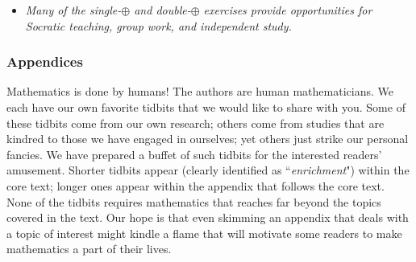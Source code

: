 \begin{itemize}
\medskip\item
{\em Many of the single-$\oplus$ and double-$\oplus$ exercises provide opportunities for Socratic teaching, group work, and independent study.} 

\bigskip

\noindent {}
\end{itemize}

\subsubsection{Appendices}

Mathematics is done by humans!  The authors are human mathematicians.  We each have our own favorite tidbits that we would like to share with you.  Some of these tidbits come from our own research; others come from studies that are kindred to those we have engaged in ourselves; yet others just strike our personal fancies.  We have prepared a buffet of such tidbits for the interested readers' amusement.  Shorter tidbits appear (clearly identified as ``{\em enrichment}") within the core text; longer ones appear within the appendix that follows the core text.  None of the tidbits requires mathematics that reaches far beyond the topics covered in the text.  Our hope is that even skimming an appendix that deals with a topic of interest might kindle a flame that will motivate some readers to make mathematics a part of their lives.


